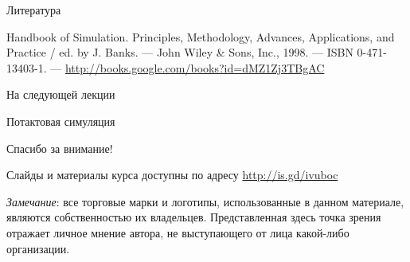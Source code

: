 \documentclass{beamer}
\begin{document}
\begin{frame}[allowframebreaks]{Литература}
\begin{thebibliography}{99}
     Handbook of Simulation. Principles, Methodology, Advances, Applications, and Practice / ed. by J. Banks. — John Wiley \& Sons, Inc., 1998. — ISBN 0-471-13403-1. — \url{http://books.google.com/books?id=dMZ1Zj3TBgAC} %
\end{thebibliography}
\end{frame}

\begin{frame}{На следующей лекции}
\centering

Потактовая симуляция

\end{frame}


\begin{frame}

{\huge{Спасибо за внимание!}\par}

\vfill

Слайды и материалы курса доступны по адресу \url{http://is.gd/ivuboc} %

\vfill

\tiny{\textit{Замечание}: все торговые марки и логотипы, использованные в данном материале, являются собственностью их владельцев. Представленная здесь точка зрения отражает личное мнение автора, не выступающего от лица какой-либо организации.}

\end{frame}
\end{document}
